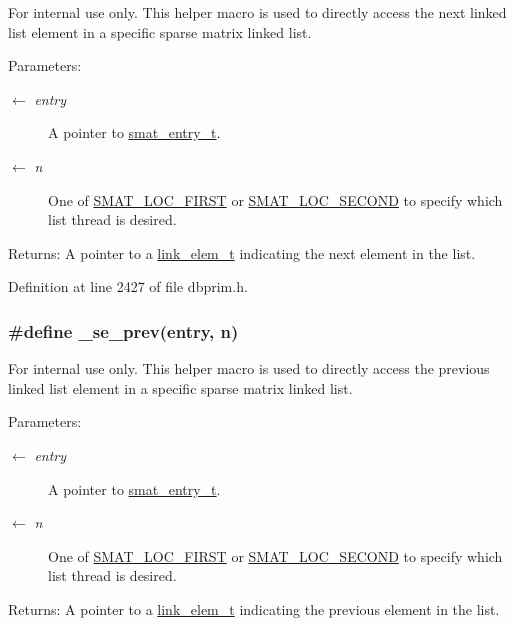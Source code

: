 \begin{Desc}
\item[For internal use only.]
This helper macro is used to directly access the next linked list element in a specific sparse matrix linked list.

\begin{Desc}
\item[Parameters:]
\begin{description}
\item[\mbox{$\leftarrow$} {\em entry}]A pointer to \hyperlink{group__dbprim__smat_ga2}{smat\_\-entry\_\-t}. \item[\mbox{$\leftarrow$} {\em n}]One of \hyperlink{group__dbprim__smat_gga70a137}{SMAT\_\-LOC\_\-FIRST} or \hyperlink{group__dbprim__smat_gga70a138}{SMAT\_\-LOC\_\-SECOND} to specify which list thread is desired.\end{description}
\end{Desc}
\begin{Desc}
\item[Returns:]A pointer to a \hyperlink{group__dbprim__link_ga1}{link\_\-elem\_\-t} indicating the next element in the list.\end{Desc}
\end{Desc}


Definition at line 2427 of file dbprim.h.\hypertarget{group__dbprim__smat_ga62}{
\subsubsection[\_\-se\_\-prev]{\setlength{\rightskip}{0pt plus 5cm}\#define \_\-se\_\-prev(entry, n)}}
\label{group__dbprim__smat_ga62}


\begin{Desc}
\item[For internal use only.]
This helper macro is used to directly access the previous linked list element in a specific sparse matrix linked list.

\begin{Desc}
\item[Parameters:]
\begin{description}
\item[\mbox{$\leftarrow$} {\em entry}]A pointer to \hyperlink{group__dbprim__smat_ga2}{smat\_\-entry\_\-t}. \item[\mbox{$\leftarrow$} {\em n}]One of \hyperlink{group__dbprim__smat_gga70a137}{SMAT\_\-LOC\_\-FIRST} or \hyperlink{group__dbprim__smat_gga70a138}{SMAT\_\-LOC\_\-SECOND} to specify which list thread is desired.\end{description}
\end{Desc}
\begin{Desc}
\item[Returns:]A pointer to a \hyperlink{group__dbprim__link_ga1}{link\_\-elem\_\-t} indicating the previous element in the list.\end{Desc}
\end{Desc}


